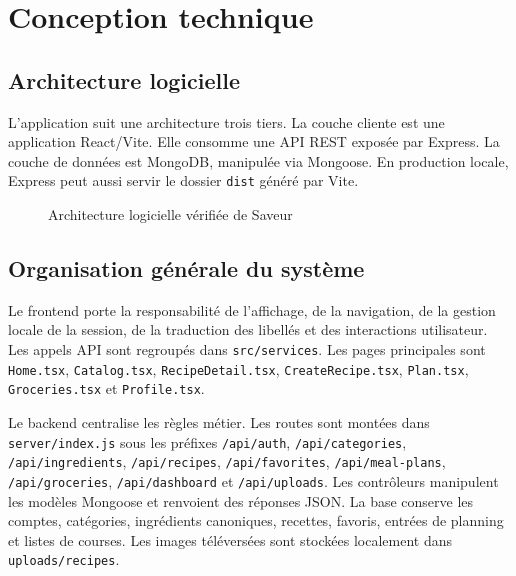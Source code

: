 \documentclass[12pt,a4paper]{report}
\begin{document}
\chapter{Conception technique}
\section{Architecture logicielle}
L'application suit une architecture trois tiers. La couche cliente est une application React/Vite. Elle consomme une API REST exposée par Express. La couche de données est MongoDB, manipulée via Mongoose. En production locale, Express peut aussi servir le dossier \texttt{dist} généré par Vite.

\begin{figure}[H]
\centering
{}
\caption{Architecture logicielle vérifiée de Saveur}
\label{fig:architecture}
\end{figure}

\section{Organisation générale du système}
Le frontend porte la responsabilité de l'affichage, de la navigation, de la gestion locale de la session, de la traduction des libellés et des interactions utilisateur. Les appels API sont regroupés dans \texttt{src/services}. Les pages principales sont \texttt{Home.tsx}, \texttt{Catalog.tsx}, \texttt{RecipeDetail.tsx}, \texttt{CreateRecipe.tsx}, \texttt{Plan.tsx}, \texttt{Groceries.tsx} et \texttt{Profile.tsx}.

Le backend centralise les règles métier. Les routes sont montées dans \texttt{server/index.js} sous les préfixes \texttt{/api/auth}, \texttt{/api/categories}, \texttt{/api/ingredients}, \texttt{/api/recipes}, \texttt{/api/favorites}, \texttt{/api/meal-plans}, \texttt{/api/groceries}, \texttt{/api/dashboard} et \texttt{/api/uploads}. Les contrôleurs manipulent les modèles Mongoose et renvoient des réponses JSON. La base conserve les comptes, catégories, ingrédients canoniques, recettes, favoris, entrées de planning et listes de courses. Les images téléversées sont stockées localement dans \texttt{uploads/recipes}.
\end{document}
